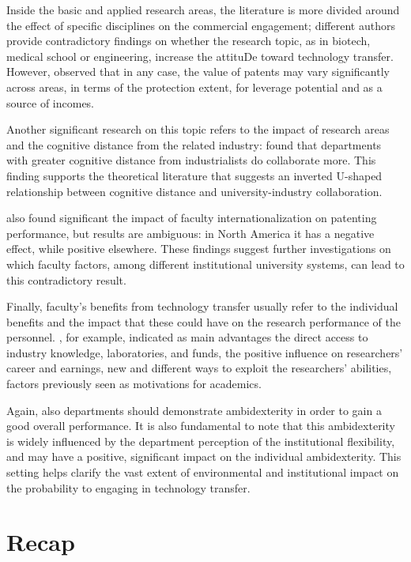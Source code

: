 Inside the basic and applied research areas, the literature is more divided around the effect of specific disciplines on the commercial engagement; different authors provide contradictory findings on whether the research topic, as in biotech, medical school or engineering, increase the attituDe toward technology transfer. However, \citet{OwenSmith2001} observed that in any case, the value of patents may vary significantly across areas, in terms of the protection extent, for leverage potential and as a source of incomes. 

Another significant research on this topic refers to the impact of research areas and the cognitive distance from the related industry: \citet{Muscio2010} found that departments with greater cognitive distance from industrialists do collaborate more. This finding supports the theoretical literature that suggests an inverted U-shaped relationship between cognitive distance and university-industry collaboration.

\citet{Wong2010} also found significant the impact of faculty internationalization on patenting performance, but results are ambiguous: in North America it has a negative effect, while positive elsewhere. These findings suggest further investigations on which faculty factors, among different institutional university systems, can lead to this contradictory result. 

Finally, faculty's benefits from technology transfer usually refer to the individual benefits and the impact that these could have on the research performance of the personnel. \citet{Baldini2007}, for example, indicated as main advantages the direct access to industry knowledge, laboratories, and funds, the positive influence on researchers' career and earnings, new and different ways to exploit the researchers' abilities, factors previously seen as motivations for academics.

Again, also departments should demonstrate ambidexterity in order to gain a good overall performance. It is also fundamental to note that this ambidexterity is widely influenced by the department perception of the institutional flexibility, and may have a positive, significant impact on the individual ambidexterity. This setting helps clarify the vast extent of environmental and institutional impact on the probability to engaging in technology transfer.

\section{Recap}

